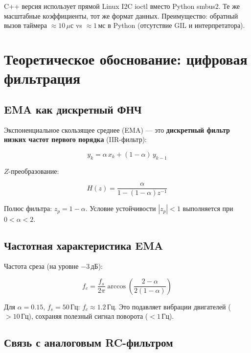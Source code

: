 C++ версия использует прямой Linux I2C ioctl вместо Python smbus2.
Те же масштабные коэффициенты, тот же формат данных.
Преимущество: обратный вызов таймера ${\approx}10\,\mu\text{с}$ vs ${\approx}1\,\text{мс}$ в Python
(отсутствие GIL и интерпретатора).

\section{Теоретическое обоснование: цифровая фильтрация}

\subsection{EMA как дискретный ФНЧ}

Экспоненциальное скользящее среднее (EMA) --- это \textbf{дискретный
фильтр низких частот первого порядка} (IIR-фильтр):

\begin{equation}
  y_k = \alpha\, x_k + (1-\alpha)\, y_{k-1}
  \label{eq:ema_filter}
\end{equation}

$Z$-преобразование:

\begin{equation}
  H(z) = \frac{\alpha}{1 - (1-\alpha)z^{-1}}
  \label{eq:ema_ztransform}
\end{equation}

Полюс фильтра: $z_p = 1 - \alpha$. Условие устойчивости $|z_p| < 1$
выполняется при $0 < \alpha < 2$.

\subsection{Частотная характеристика EMA}

Частота среза (на уровне $-3\,\text{дБ}$):

\begin{equation}
  f_c = \frac{f_s}{2\pi}\arccos\!\left(\frac{2-\alpha}{2(1-\alpha)}\right)
  \label{eq:ema_cutoff}
\end{equation}

Для $\alpha = 0.15$, $f_s = 50\,\text{Гц}$: $f_c \approx 1.2\,\text{Гц}$.
Это подавляет вибрации двигателей ($> 10\,\text{Гц}$), сохраняя
полезный сигнал поворота ($< 1\,\text{Гц}$).

\subsection{Связь с аналоговым RC-фильтром}

